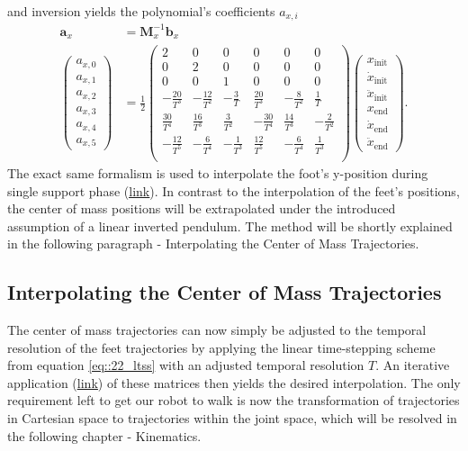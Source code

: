 and inversion yields the polynomial's coefficients $a_{x,i}$
\begin{align}
	\bm{a}_x &= \bm{M}_x^{-1}\bm{b}_x \\
	\begin{pmatrix}
		a_{x,0} \\
		a_{x,1} \\
		a_{x,2} \\
		a_{x,3} \\
		a_{x,4} \\
		a_{x,5}
	\end{pmatrix} &= 
	\frac{1}{2}
	\begin{pmatrix}
		2 & 0 & 0 & 0 & 0 & 0 \\
		0 & 2 & 0 & 0 & 0 & 0 \\
		0 & 0 & 1 & 0 & 0 & 0 \\
		-\frac{20}{T^3} & -\frac{12}{T^2} & -\frac{3}{T} & \frac{20}{T^3} & -\frac{8}{T^2} & \frac{1}{T} \\
		\frac{30}{T^4} & \frac{16}{T^3} & \frac{3}{T^2} & -\frac{30}{T^4} & \frac{14}{T^3} & -\frac{2}{T^2} \\
		-\frac{12}{T^5} & -\frac{6}{T^4} & -\frac{1}{T^3} & \frac{12}{T^5} & -\frac{6}{T^4} & \frac{1}{T^3} \\
	\end{pmatrix}
	\begin{pmatrix}
		x_\text{init} \\
		\dot{x}_\text{init} \\
		\ddot{x}_\text{init} \\
		x_\text{end} \\
		\dot{x}_\text{end} \\
		\ddot{x}_\text{end} 
	\end{pmatrix}.
\end{align}
The exact same formalism is used to interpolate the foot's y-position during single support phase (\href{https://github.com/mhubii/nmpc_pattern_generator/blob/c82c64a28da7527e75442764f585bd50a8f61ee9/libs/pattern_generator/src/interpolation.cpp#L806}{\underline{link}}). In contrast to the interpolation of the feet's positions, the center of mass positions will be extrapolated under the introduced assumption of a linear inverted pendulum. The method will be shortly explained in the following paragraph - Interpolating the Center of Mass Trajectories.
\FloatBarrier
\subsection{Interpolating the Center of Mass Trajectories}
The center of mass trajectories can now simply be adjusted to the temporal resolution of the feet trajectories by applying the linear time-stepping scheme from equation \ref{eq::22_ltss} with an adjusted temporal resolution $T$. An iterative application (\href{https://github.com/mhubii/nmpc_pattern_generator/blob/5a213044c927dc6aac9f7e32ce1e5fb472cd67bb/libs/pattern_generator/src/interpolation.cpp#L776}{\underline{link}}) of these matrices then yields the desired interpolation. The only requirement left to get our robot to walk is now the transformation of trajectories in Cartesian space to trajectories within the joint space, which will be resolved in the following chapter - Kinematics.
